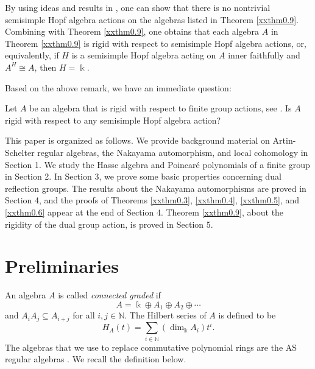 \begin{remark}
\label{xxrem0.10}
By using ideas and results in \cite{EW2}, one can show that 
there is no nontrivial semisimple Hopf algebra actions on the 
algebras listed in Theorem \ref{xxthm0.9}. Combining
\cite[Theorem 0.2 and Corollary 0.4]{KKZ1} with Theorem \ref{xxthm0.9}, one obtains that
each algebra $A$  in Theorem \ref{xxthm0.9} is rigid with respect 
to semisimple Hopf algebra actions, or, equivalently, if $H$ is a 
semisimple Hopf algebra acting on $A$ inner faithfully and 
$A^H\cong A$, then $H=\Bbbk$.  
\end{remark}

Based on the above remark, we have an immediate question:

\begin{question}
\label{xxque0.11} 
Let $A$ be an algebra that is rigid with respect to finite group 
actions, see \cite{KKZ1}. Is $A$ rigid with respect to 
any semisimple Hopf algebra action? 
\end{question}

This paper is organized as follows. We provide background material 
on Artin-Schelter regular algebras, the Nakayama automorphism, and local 
cohomology  in Section 1. We study the Hasse algebra and Poincar{\'e}
polynomials of a finite group in Section 2. 
In Section 3, we prove some basic properties concerning 
dual reflection groups. The results about the Nakayama automorphisms
are proved in Section 4, and the proofs of Theorems \ref{xxthm0.3}, \ref{xxthm0.4}, \ref{xxthm0.5}, and \ref{xxthm0.6} appear at the end of Section 4.  Theorem \ref{xxthm0.9}, about the rigidity of the dual group action, 
is proved in Section 5.

\section{Preliminaries}
\label{xxsec1}

An algebra $A$ is called {\it connected graded} if
$$A=\Bbbk \oplus A_1\oplus A_2\oplus \cdots$$
and $A_iA_j\subseteq A_{i+j}$ for all $i,j\in {\mathbb N}$.
The Hilbert series of $A$ is defined to be
$$H_A(t)=\sum_{i\in {\mathbb N}} (\dim_{\Bbbk} A_i)t^i.$$
The algebras that we use to replace commutative polynomial rings
are the AS regular algebras \cite{AS}. We recall the definition
below.

